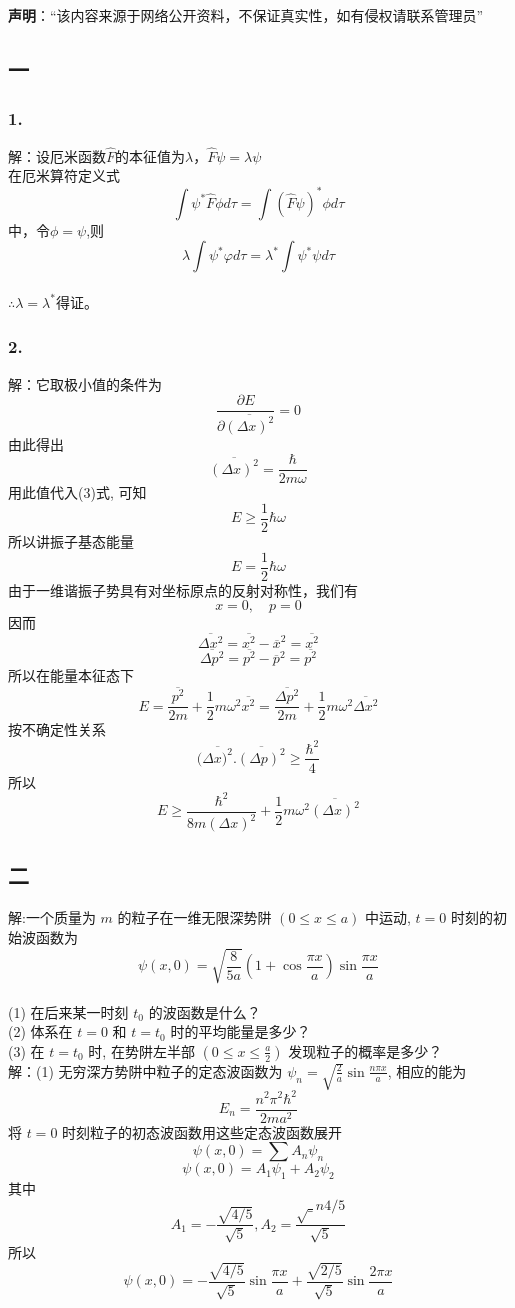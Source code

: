 
\textbf{声明}：“该内容来源于网络公开资料，不保证真实性，如有侵权请联系管理员”

\subsection{一}
\subsubsection{1.}
解：设厄米函数$\hat{F}$的本征值为$\lambda$，$\hat{F}\psi = \lambda \psi$\\
在厄米算符定义式$$\int \psi^* \hat{F} \phi d\tau = \int (\hat{F} \psi)^* \phi d\tau~$$中，令$\phi=\psi$,则$$\lambda \int \psi^* \varphi d\tau = \lambda^* \int \psi^* \psi d\tau~$$\\
$\therefore \lambda=\lambda^*$得证。
\subsubsection{2.}
解：它取极小值的条件为
$$\frac{\partial E}{\partial \overline{(\Delta x)^2}} = 0~$$
由此得出
$$\overline{(\Delta x)^2} = \frac{\hbar}{2 m \omega}~$$
用此值代入(3)式, 可知
$$E \geq \frac{1}{2} \hbar \omega~$$
所以讲振子基态能量
$$E = \frac{1}{2} \hbar \omega~$$
由于一维谐振子势具有对坐标原点的反射对称性，我们有
$$ x = 0, \quad  p = 0~$$
因而
$$ \overline{\Delta x^2} =\overline{x^2} -\overline{x}^2 =\overline{x^2}~ $$
$$ \overline{\Delta p^2} =\overline{p^2} - \overline{p}^2 =\overline{p^2}~ $$
所以在能量本征态下
$$ E = \frac{\overline{p^2}}{2m} + \frac{1}{2} m \omega^2\overline{x^2}= \frac{\overline{\Delta p^2}}{2m} + \frac{1}{2} m \omega^2 \overline{\Delta x^2}~$$
按不确定性关系
$$ (\overline{\Delta x)^2}.\overline{(\Delta p)^2}\geq \frac{\hbar^2}{4}~$$
所以
$$ E \geq \frac{\hbar^2}{8m (\Delta x)^2} + \frac{1}{2} m \omega^2 \overline{(\Delta x)^2}~$$
\subsection{二}
解:一个质量为 $m$ 的粒子在一维无限深势阱 $(0 \leq x \leq a)$ 中运动, $t = 0$ 时刻的初始波函数为
$$\psi(x, 0) = \sqrt{\frac{8}{5a}} \left(1 + \cos \frac{\pi x}{a}\right)\sin \frac{\pi x}{a}~$$\\
(1) 在后来某一时刻 $t_0$ 的波函数是什么？\\
(2) 体系在 $t = 0$ 和 $t = t_0$ 时的平均能量是多少？\\
(3) 在 $t = t_0$ 时, 在势阱左半部 $(0 \leq x \leq \frac{a}{2})$ 发现粒子的概率是多少？\\
解：(1) 无穷深方势阱中粒子的定态波函数为 $\psi_n = \sqrt{\frac{2}{a}} \sin \frac{n\pi x}{a}$, 相应的能为 
$$E_n = \frac{n^2 \pi^2 \hbar^2}{2ma^2}~$$
将 $t = 0$ 时刻粒子的初态波函数用这些定态波函数展开
$$\psi(x, 0) = \sum A_n \psi_n~$$
$$\psi(x, 0) = A_1 \psi_1 + A_2 \psi_2~$$
其中 
$$A_1 = -\frac{\sqrt{4/5}}{\sqrt{5}}, A_2 = \frac{\sqrt_n{4/5}}{\sqrt{5}}~$$
所以
$$\psi(x, 0) = -\frac{\sqrt{4/5}}{\sqrt{5}} \sin \frac{\pi x}{a} + \frac{\sqrt{2/5}}{\sqrt{5}} \sin \frac{2\pi x}{a}~$$
